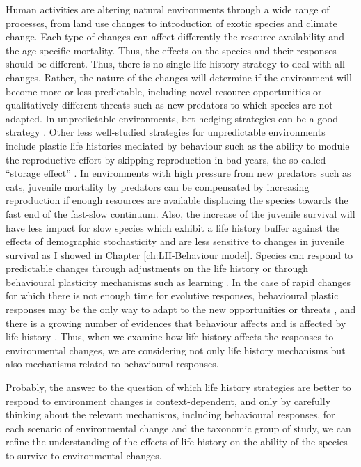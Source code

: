 Human activities are altering natural environments through a wide range of
processes, from land use changes to introduction of exotic species and climate
change. Each type of changes can affect differently the resource availability
and the age-specific mortality. Thus, the effects on the species and their
responses should be different. Thus, there is no single life history strategy to
deal with all changes. Rather, the nature of the changes will determine if the
environment will become more or less predictable, including novel resource
opportunities or qualitatively different threats such as new predators to which
species are not adapted.
In unpredictable environments, bet-hedging strategies can be a good strategy
\citep{Starrfelt2012}. Other less well-studied strategies for unpredictable
environments include plastic life histories mediated by behaviour such as the
ability to module the reproductive effort by skipping reproduction in bad years,
the so called ``storage effect'' \citep{Forcada2008}.
In environments with high pressure from new predators such as cats, juvenile
mortality by predators can be compensated by increasing reproduction if enough
resources are available \citep{Yeh2004} displacing the species towards the fast
end of the fast-slow continuum. Also, the increase of the juvenile survival
will have less impact for slow species which exhibit a life history buffer
against the effects of demographic stochasticity and are
less sensitive to changes in juvenile survival as I showed in Chapter
\ref{ch:LH-Behaviour model}.
Species can respond to predictable changes through adjustments on the life
history \citep{Evans2005} or through behavioural plasticity mechanisms such as
learning \citep{Laundre2001,Evans2012}.
In the case of rapid changes for which there is not enough time for evolutive
responses, behavioural plastic responses may be the only way to adapt to the
new opportunities or threats \citep{Sol2009}, and there is a growing number of
evidences that behaviour affects and is affected by life history
\citep{Sol2016}.
Thus, when we examine how life history affects the responses to environmental
changes, we are considering not only life history mechanisms but also mechanisms
related to behavioural responses.

Probably, the answer to the question of which life history strategies are
better to respond to environment changes is context-dependent, and only by
carefully thinking about the relevant mechanisms, including behavioural
responses, for each scenario of environmental change and the taxonomic group of
study, we can refine the understanding of the effects of life history on the
ability of the species to survive to environmental changes.


